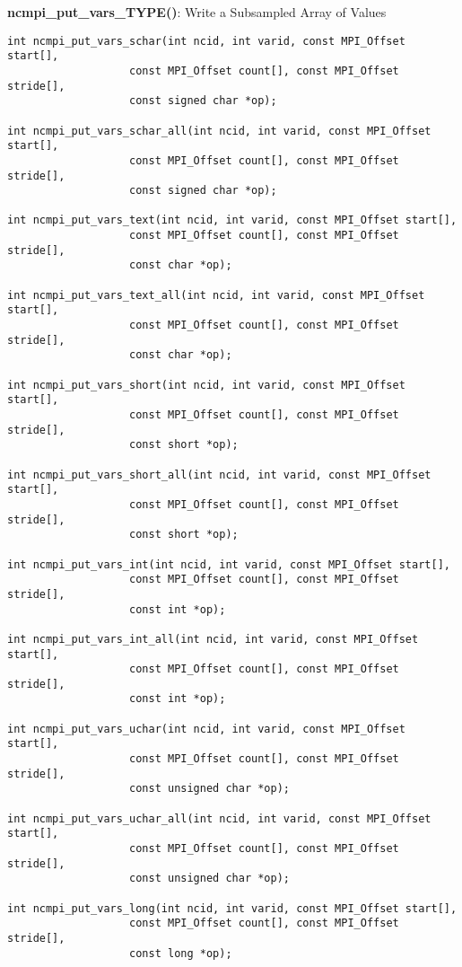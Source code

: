 {\bf ncmpi\_put\_vars\_TYPE()}: Write a Subsampled Array of Values

\begin{verbatim}
int ncmpi_put_vars_schar(int ncid, int varid, const MPI_Offset start[],
                   const MPI_Offset count[], const MPI_Offset stride[],
                   const signed char *op);

int ncmpi_put_vars_schar_all(int ncid, int varid, const MPI_Offset start[],
                   const MPI_Offset count[], const MPI_Offset stride[],
                   const signed char *op);

int ncmpi_put_vars_text(int ncid, int varid, const MPI_Offset start[],
                   const MPI_Offset count[], const MPI_Offset stride[],
                   const char *op);

int ncmpi_put_vars_text_all(int ncid, int varid, const MPI_Offset start[],
                   const MPI_Offset count[], const MPI_Offset stride[],
                   const char *op);

int ncmpi_put_vars_short(int ncid, int varid, const MPI_Offset start[],
                   const MPI_Offset count[], const MPI_Offset stride[],
                   const short *op);

int ncmpi_put_vars_short_all(int ncid, int varid, const MPI_Offset start[],
                   const MPI_Offset count[], const MPI_Offset stride[],
                   const short *op);

int ncmpi_put_vars_int(int ncid, int varid, const MPI_Offset start[],
                   const MPI_Offset count[], const MPI_Offset stride[],
                   const int *op);

int ncmpi_put_vars_int_all(int ncid, int varid, const MPI_Offset start[],
                   const MPI_Offset count[], const MPI_Offset stride[],
                   const int *op);

int ncmpi_put_vars_uchar(int ncid, int varid, const MPI_Offset start[],
                   const MPI_Offset count[], const MPI_Offset stride[],
                   const unsigned char *op);

int ncmpi_put_vars_uchar_all(int ncid, int varid, const MPI_Offset start[],
                   const MPI_Offset count[], const MPI_Offset stride[],
                   const unsigned char *op);

int ncmpi_put_vars_long(int ncid, int varid, const MPI_Offset start[],
                   const MPI_Offset count[], const MPI_Offset stride[],
                   const long *op);


\end{verbatim}
